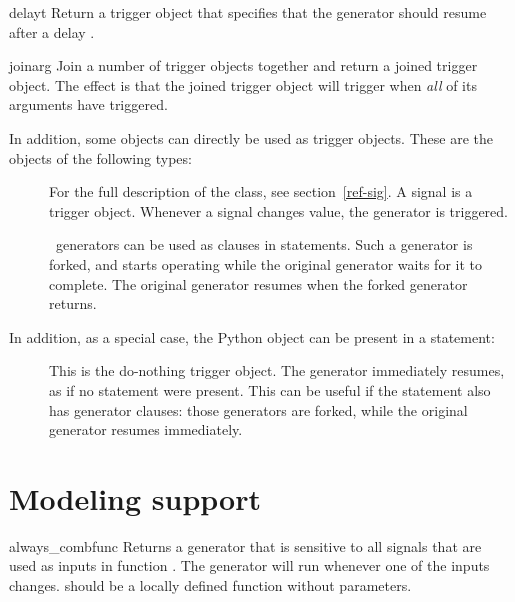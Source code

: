 \begin{funcdesc}{delay}{t}
Return a trigger object that specifies that the generator should
resume after a delay .
\end{funcdesc}

\begin{funcdesc}{join}{arg }
Join a number of trigger objects together and return a joined
trigger object.  The effect is that the joined trigger object will
trigger when \emph{all} of its arguments have triggered.
\end{funcdesc}

In addition, some objects can directly be used as trigger
objects. These are the objects of the following types:

\begin{description}
\item[]
For the full description of the  class, see
section~\ref{ref-sig}.
A signal is a trigger object. Whenever a signal changes value, the
generator is triggered.

\item[]
\myhdl\ generators can be used as clauses in 
statements. Such a generator is forked, and starts operating
while the original generator
waits for it to complete. The original generator resumes when the
forked generator returns.
\end{description}

In addition, as a special case, the Python  object can be
present in  a  statement:
\begin{description}

\item[]
This is the do-nothing trigger object. The generator immediately
resumes, as if no  statement were present. This can be
useful if the  statement also has generator clauses: those
generators are forked, while the original generator resumes
immediately.
\end{description}



\section{Modeling support\label{ref-misc}}

\begin{funcdesc}{always_comb}{func}
Returns a generator that is sensitive to all signals that
are used as inputs in function . The generator
will run  whenever one of the inputs changes.
 should be a locally defined function without
parameters.
\end{funcdesc}


